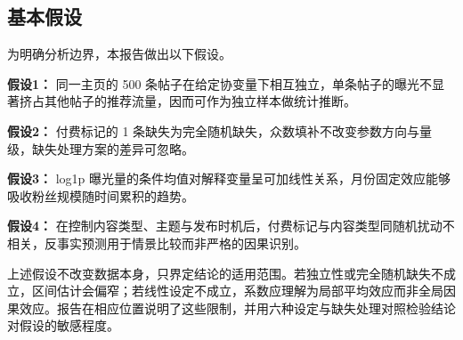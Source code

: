 \subsection{基本假设}

为明确分析边界，本报告做出以下假设。

\textbf{假设1：} 同一主页的 500 条帖子在给定协变量下相互独立，单条帖子的曝光不显著挤占其他帖子的推荐流量，因而可作为独立样本做统计推断。

\textbf{假设2：} 付费标记的 1 条缺失为完全随机缺失，众数填补不改变参数方向与量级，缺失处理方案的差异可忽略。

\textbf{假设3：} log1p 曝光量的条件均值对解释变量呈可加线性关系，月份固定效应能够吸收粉丝规模随时间累积的趋势。

\textbf{假设4：} 在控制内容类型、主题与发布时机后，付费标记与内容类型同随机扰动不相关，反事实预测用于情景比较而非严格的因果识别。

上述假设不改变数据本身，只界定结论的适用范围。若独立性或完全随机缺失不成立，区间估计会偏窄；若线性设定不成立，系数应理解为局部平均效应而非全局因果效应。报告在相应位置说明了这些限制，并用六种设定与缺失处理对照检验结论对假设的敏感程度。
